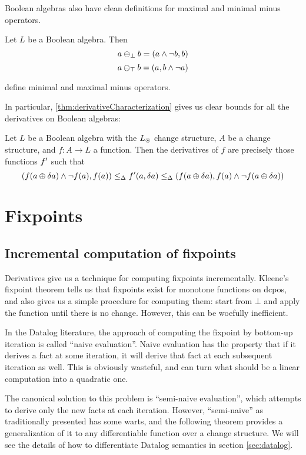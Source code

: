 Boolean algebras also have clean definitions for maximal and minimal minus
operators.

\begin{prop}
  Let $L$ be a Boolean algebra. Then
  $$a \ominus_\bot b = (a \wedge \neg b, b)$$
  $$a \ominus_\top b = (a, b \wedge \neg a)$$

  define minimal and maximal minus operators.
\end{prop}

In particular, \ref{thm:derivativeCharacterization} gives us clear bounds for
all the derivatives on Boolean algebras:

\begin{corollary}
\label{cor:booleanCharacterization}
  Let $L$ be a Boolean algebra with the $L_\circledast$ change structure, $A$ be
  a change structure, and $f: A \rightarrow
  L$ a function. Then the derivatives of $f$ are precisely those functions
  $f'$ such that
  $$
  (
    f(a \oplus \delta a) \wedge \neg f(a), 
    f(a)
  )
  \leq_\Delta
  f'(a, \delta a)
  \leq_\Delta
  (
    f(a \oplus \delta a), 
    f(a) \wedge \neg f(a \oplus \delta a)
  )
  $$
\end{corollary}

\section{Fixpoints}

\subsection{Incremental computation of fixpoints}

Derivatives give us a technique for computing fixpoints incrementally. Kleene's
fixpoint theorem tells us that fixpoints exist for monotone functions on dcpos, and also gives us
a simple procedure for computing them: start from $\bot$ and apply the function
until there is no change. However, this can be woefully inefficient.

In the Datalog literature, the approach of computing the fixpoint by bottom-up
iteration is called ``naive evaluation''. Naive evaluation has the property that
if it derives a fact at some iteration, it will derive that fact at each
subsequent iteration as well. This is obviously wasteful, and can turn what
should be a linear computation into a quadratic one.

The canonical solution to this problem is ``semi-naive evaluation'', which
attempts to derive only the new facts at each iteration. However, ``semi-naive''
as traditionally presented has some warts, and
the following theorem provides a generalization of it to any differentiable function over a
change structure. We will see the details of how to differentiate Datalog
semantics in section \ref{sec:datalog}.

